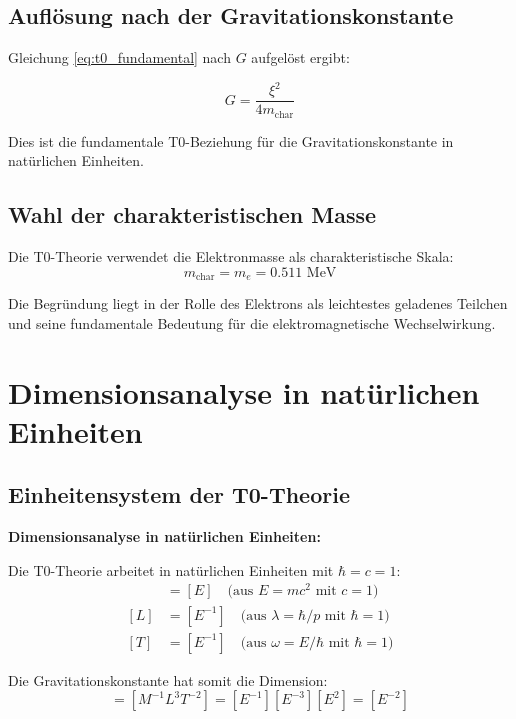 \documentclass[12pt,a4paper]{article}
\begin{document}
	\subsection{Auflösung nach der Gravitationskonstante}
	
	Gleichung \eqref{eq:t0_fundamental} nach $G$ aufgelöst ergibt:
	
	\begin{equation}
		G = \frac{\xi^2}{4 m_{\text{char}}}
		\label{eq:g_fundamental}
	\end{equation}
	
	Dies ist die fundamentale T0-Beziehung für die Gravitationskonstante in natürlichen Einheiten.
	
	\subsection{Wahl der charakteristischen Masse}
	
	Die T0-Theorie verwendet die Elektronmasse als charakteristische Skala:
	\begin{equation}
		m_{\text{char}} = m_e = 0.511 \text{ MeV}
		\label{eq:characteristic_mass}
	\end{equation}
	
	Die Begründung liegt in der Rolle des Elektrons als leichtestes geladenes Teilchen und seine fundamentale Bedeutung für die elektromagnetische Wechselwirkung.
	
	\section{Dimensionsanalyse in natürlichen Einheiten}
	
	\subsection{Einheitensystem der T0-Theorie}
	
	\begin{dimensional}
		\textbf{Dimensionsanalyse in natürlichen Einheiten:}
		
		Die T0-Theorie arbeitet in natürlichen Einheiten mit $\hbar = c = 1$:
		\begin{align}
			[M] &= [E] \quad \text{(aus } E = mc^2 \text{ mit } c = 1\text{)} \\
			[L] &= [E^{-1}] \quad \text{(aus } \lambda = \hbar/p \text{ mit } \hbar = 1\text{)} \\
			[T] &= [E^{-1}] \quad \text{(aus } \omega = E/\hbar \text{ mit } \hbar = 1\text{)}
		\end{align}
		
		Die Gravitationskonstante hat somit die Dimension:
		\begin{equation}
			[G] = [M^{-1}L^3T^{-2}] = [E^{-1}][E^{-3}][E^2] = [E^{-2}]
		\end{equation}
	\end{dimensional}
	
\end{document}
